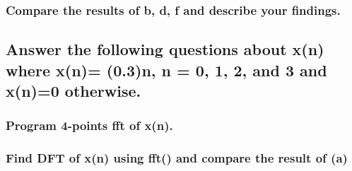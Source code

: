 \documentclass[12pt,a4paper]{article}
\begin{document}
\subsubsection{Compare the results of b, d, f and describe your findings.} 
\subsection{Answer the following questions about x(n) where x(n)= (0.3)n, n = 0, 1, 2, and 3 and x(n)=0 otherwise.}  
	
\subsubsection{Program 4-points fft of x(n).} 
\subsubsection{Find DFT of x(n) using fft() and compare the result of (a)} 
\end{document}
